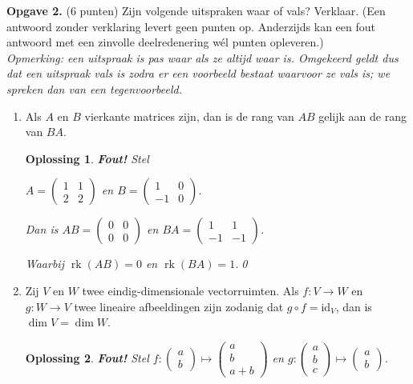 \documentclass[a4paper,12pt]{article}
\newtheorem{oplossing}{Oplossing}
\begin{document}
\textbf{Opgave 2.} (6 punten) Zijn volgende uitspraken waar of vals? Verklaar. (Een antwoord zonder verklaring levert geen punten op. Anderzijds kan een fout antwoord met een zinvolle deelredenering wél punten opleveren.) \\
\textit{Opmerking: een uitspraak is pas waar als ze altijd waar is. Omgekeerd geldt dus dat een uitspraak vals is zodra er een voorbeeld bestaat waarvoor ze vals is; we spreken dan van een tegenvoorbeeld.}
\begin{enumerate}
    \item[(i)] Als $A$ en $B$ vierkante matrices zijn, dan is de rang van $AB$ gelijk aan de rang van $BA$.
    \begin{oplossing}
        \textbf{Fout!}
        Stel

        \(A =
        \begin{pmatrix}
            1 & 1 \\
            2 & 2
        \end{pmatrix}
        \)
        en 
        \(B =
        \begin{pmatrix}
            1 & 0 \\
            -1 & 0
        \end{pmatrix}
        \).

        Dan is 
        \(AB =
        \begin{pmatrix}
            0 & 0 \\
            0 & 0
        \end{pmatrix}
        \)
        en
        \(BA =
        \begin{pmatrix}
            1 & 1 \\
            -1 & -1
        \end{pmatrix}
        \).

        Waarbij \(\operatorname{rk}(AB) = 0\) en \(\operatorname{rk}(BA) = 1\).\qed
    \end{oplossing}
    \item[(ii)] Zij $V$ en $W$ twee eindig-dimensionale vectorruimten. Als $f:V \to W$ en $g:W \to V$ twee lineaire afbeeldingen zijn zodanig dat $g \circ f = \text{id}_{V}$, dan is $\dim V = \dim W$.
    \begin{oplossing}
        \textbf{Fout!}
        Stel \(f: \begin{pmatrix}
            a \\
            b
        \end{pmatrix}
        \mapsto
        \begin{pmatrix}
            a \\ b \\ a+b
        \end{pmatrix}
        \)
        en
        \(g: \begin{pmatrix}
            a \\ b \\ c 
        \end{pmatrix}
        \mapsto 
        \begin{pmatrix}
            a \\ b
        \end{pmatrix}\).


\end{oplossing}
\end{enumerate}
\end{document}
